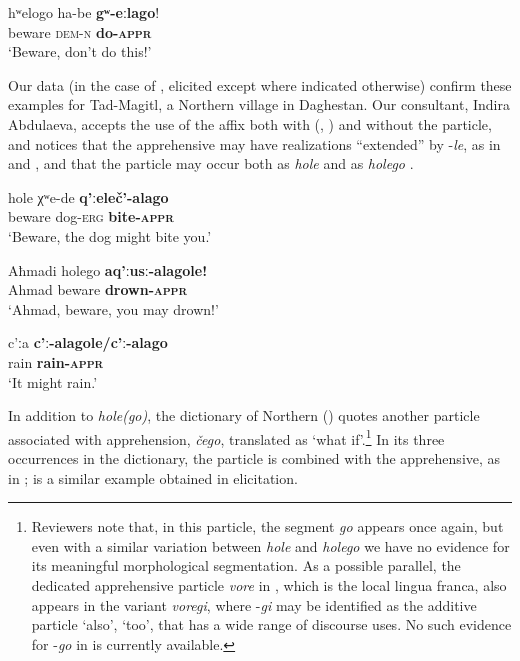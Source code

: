 \documentclass[output=paper,colorlinks,citecolor=brown]{langscibook}
\begin{document}
\ea \label{ex:DD61}
\gll hʷelogo ha-be \textbf{gʷ-eːlago}! \\
beware \textsc{dem-n} \textbf{do-\textsc{appr}} \\
\glt `Beware, don't do this!' \citep{Creisselsunpublished1}
\z

 Our data (in the case of , elicited except where indicated otherwise) confirm these examples for Tad-Magitl, a Northern  village in Daghestan. Our consultant, Indira Abdulaeva, accepts the use of the affix both with (, ) and without  the particle, and notices that the apprehensive may have realizations ``extended'' by \nobreakdash-\textit{le}, as in  and , and that the particle may occur both as \textit{hole}  and as \textit{holego} .

\ea \label{ex:DD62}
\gll hole χʷe-de \textbf{q'ːeleč'-alago} \\
beware dog-\textsc{erg} \textbf{bite-\textsc{appr}} \\
\glt `Beware, the dog might bite you.'
\z

\ea \label{ex:DD63}
\gll Aħmadi holego \textbf{aq'ːusː-alagole!} \\
Ahmad beware \textbf{drown-\textsc{appr}} \\
\glt `Ahmad, beware, you may drown!'
\z

\ea \label{ex:DD64}
\gll c'ːa \textbf{c'ː-alagole\textup{/}c'ː-alago} \\
rain \textbf{rain-\textsc{appr}} \\
\glt `It might rain.'
\z

 In addition to \textit{hole(go)}, the dictionary of Northern  (\citealt{MagomedovaAbdulaeva2007}) quotes another particle associated with apprehension, \textit{čego}, translated as `what if'.\footnote{Reviewers note that, in this particle, the segment \textit{go} appears once again, but even with a similar variation between \textit{hole} and \textit{holego} we have no evidence for its meaningful morphological segmentation. As a possible parallel, the dedicated apprehensive particle \textit{vore} in , which is the local lingua franca, also appears in the variant \textit{voregi}, where \nobreakdash-\textit{gi} may be identified as the additive particle `also', `too', that has a wide range of discourse uses. No such evidence for \nobreakdash-\textit{go} in  is currently available.} In its three occurrences in the dictionary, the particle is combined with the apprehensive, as in ;  is a similar example obtained in elicitation.
\end{document}
